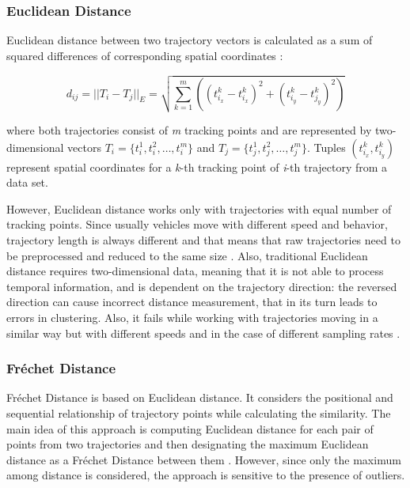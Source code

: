 \subsubsection{Euclidean Distance}

Euclidean distance between two trajectory vectors is calculated as a sum of squared differences of corresponding spatial coordinates \cite{article:27_vna_cad_td}:

\begin{equation}
	 d_{ij} = ||T_i - T_j||_E = \sqrt{\sum_{k=1}^{m}((t_{i_x}^k - t_{i_x}^k)^2 + (t_{i_y}^k - t_{j_y}^k)^2)}
\end{equation}

where both trajectories consist of \textit{m} tracking points and are represented by two-dimensional vectors $T_i = \{t_i^1, t_i^2, \ldots, t_i^m\}$ and $T_j = \{t_j^1, t_j^2, \ldots, t_j^m\}$. Tuples $(t_{i_x}^k, t_{i_y}^k)$ represent spatial coordinates for a \textit{k}-th tracking point of \textit{i}-th trajectory from a data set.

However, Euclidean distance works only with trajectories with equal number of tracking points. Since usually vehicles move with different speed and behavior, trajectory length is always different and that means that raw trajectories need to be preprocessed and reduced to the same size \cite{inproceedings:7_related_work}. Also, traditional Euclidean distance requires two-dimensional data, meaning that it is not able to process temporal information, and is dependent on the trajectory direction: the reversed direction can cause incorrect distance measurement, that in its turn leads to errors in clustering. Also, it fails while working with trajectories moving in a similar way but with different speeds and in the case of different sampling rates \cite{inproceedings:28_lcss_dsmt}.

\subsubsection{Fréchet Distance}

Fréchet Distance is based on Euclidean distance. It considers the positional and sequential relationship of trajectory points while calculating the similarity. The main idea of this approach is computing Euclidean distance for each pair of points from two trajectories and then designating the maximum Euclidean distance as a Fréchet Distance between them \cite{article:8_review_mot_cl_alg}\cite{inproceedings:29_fr_dist}. However, since only the maximum among distance is considered, the approach is sensitive to the presence of outliers.

